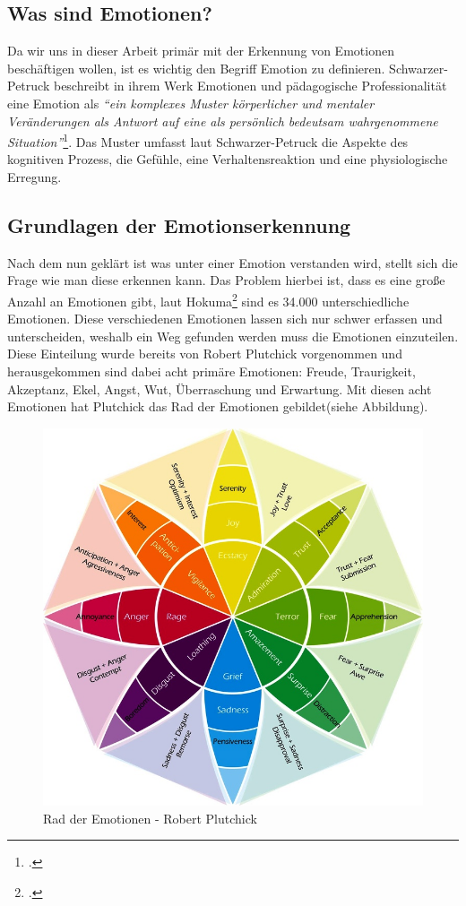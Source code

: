 \subsection{Was sind Emotionen?}
Da wir uns in dieser Arbeit primär mit der Erkennung von Emotionen beschäftigen wollen, ist es wichtig den Begriff Emotion zu definieren.
Schwarzer-Petruck beschreibt in ihrem Werk Emotionen und pädagogische Professionalität eine Emotion als \textit{``ein komplexes
Muster körperlicher und mentaler Veränderungen als Antwort auf eine als persönlich bedeutsam wahrgenommene Situation''}\footcite[S.51 Z.20ff]{Sch13}.
Das Muster umfasst laut Schwarzer-Petruck die Aspekte des kognitiven Prozess, die Gefühle, eine Verhaltensreaktion und eine physiologische Erregung.
\subsection{Grundlagen der Emotionserkennung}
Nach dem nun geklärt ist was unter einer Emotion verstanden wird, stellt sich die Frage wie man diese erkennen kann. Das Problem hierbei ist, dass es eine große Anzahl an Emotionen gibt, laut Hokuma\footcite[Vgl.][Absch. 1]{Hok17} sind es 34.000 unterschiedliche Emotionen. Diese verschiedenen Emotionen lassen sich nur schwer erfassen und unterscheiden, weshalb ein Weg gefunden werden muss die Emotionen einzuteilen. Diese Einteilung wurde bereits von Robert Plutchick vorgenommen und herausgekommen sind dabei acht primäre Emotionen: Freude, Traurigkeit, Akzeptanz, Ekel, Angst, Wut, Überraschung und Erwartung.\newline
Mit diesen acht Emotionen hat Plutchick das Rad der Emotionen gebildet(siehe Abbildung).
\begin{figure}[h]
	\centering
	\includegraphics[width=16cm]{Bilder/wheel-of-emotions.png}
	\caption[Rad der Emotionen - Robert Plutchick]{Rad der Emotionen - Robert Plutchick\footnotemark}
\end{figure}%
